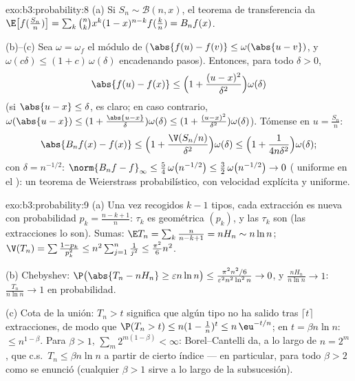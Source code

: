 \begin{solution}{exo:b3:probability:8}
(a) Si $S_n \sim \mathcal B(n, x)$, el teorema de transferencia da
$\E\bigl[f(\frac{S_n}n)\bigr] =
\sum_k\binom nkx^k(1-x)^{n-k}f(\frac kn) = B_nf(x)$.

(b)--(c) Sea $\omega = \omega_f$ el módulo de
($\abs{f(u) - f(v)} \leq \omega(\abs{u - v})$, y $\omega(c
\delta) \leq (1 + c)\,\omega(\delta)$ encadenando pasos). Entonces, para
todo $\delta > 0$,
\[
\abs{f(u) - f(x)} \leq \Bigl(1 + \frac{(u -
x)^2}{\delta^2}\Bigr)\omega(\delta)
\]
(si $\abs{u - x} \leq \delta$, es claro; en caso contrario,
$\omega(\abs{u-x}) \leq (1 + \frac{\abs{u-x}}\delta)
\omega(\delta) \leq (1 + \frac{(u-x)^2}{\delta^2})
\omega(\delta)$). Tómense 
en $u = \frac{S_n}n$:
\[
\abs{B_nf(x) - f(x)} \leq
\Bigl(1 + \frac{\V(S_n/n)}{\delta^2}\Bigr)\omega(\delta)
\leq \Bigl(1 + \frac{1}{4n\delta^2}\Bigr)\omega(\delta) ;
\]
con $\delta = n^{-1/2}$: $\norm{B_nf - f}_\infty \leq
\frac54\,\omega\bigl(n^{-1/2}\bigr) \leq
\frac32\,\omega\bigl(n^{-1/2}\bigr) \to 0$
( uniforme en el
): un teorema de Weierstrass
probabilístico, con velocidad explícita y uniforme.
\end{solution}

\begin{solution}{exo:b3:probability:9}
(a) Una vez recogidos $k - 1$ tipos, cada extracción es nueva con
probabilidad $p_k = \frac{n-k+1}n$: $\tau_k$ es geométrica $(p_k)$, y
las $\tau_k$ son
 (las
extracciones lo son). Sumas:
$\E T_n = \sum_k\frac n{n-k+1} = nH_n \sim n\ln n$;
$\V(T_n) = \sum\frac{1 - p_k}{p_k^2} \leq
n^2\sum_{j=1}^n\frac1{j^2} \leq \frac{\pi^2}6n^2$.

(b) Chebyshev: $\P\bigl(\abs{T_n - nH_n} \geq \varepsilon
n\ln n\bigr) \leq \frac{\pi^2n^2/6}{\varepsilon^2n^2\ln^2n}
\to 0$, y $\frac{nH_n}{n\ln n} \to 1$: $\frac{T_n}{n\ln n}
\to 1$ en probabilidad.

(c) Cota de la unión: $T_n > t$ significa que algún tipo no ha salido
tras $\lceil t\rceil$ extracciones, de modo que $\P(T_n > t) \leq n(1 -
\frac1n)^{t} \leq n\,\eu^{-t/n}$; en $t = \beta n\ln n$:
$\leq n^{1 - \beta}$. Para $\beta > 1$, $\sum_m
2^{m(1-\beta)} < \infty$: Borel--Cantelli da, a lo largo de $n =
2^m$, que c.s.\ $T_n \leq \beta n\ln n$ a partir de cierto índice --- en
particular, para todo $\beta > 2$ como se enunció (cualquier $\beta > 1$
sirve a lo largo de la subsucesión).
\end{solution}


